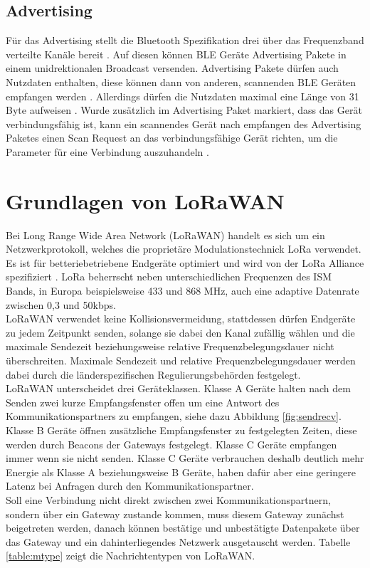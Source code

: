 \subsection{Advertising}
Für das Advertising stellt die Bluetooth Spezifikation drei über das Frequenzband verteilte Kanäle bereit \cite{blue2010channel}.
Auf diesen können BLE Geräte Advertising Pakete in einem unidrektionalen Broadcast versenden.
Advertising Pakete dürfen auch Nutzdaten enthalten, diese können dann von anderen, scannenden BLE Geräten empfangen werden \cite{blue2010advertising}.
Allerdings dürfen die Nutzdaten maximal eine Länge von 31 Byte aufweisen \cite{blue2010pdu}.
Wurde zusätzlich im Advertising Paket markiert, dass das Gerät verbindungsfähig ist, kann ein scannendes Gerät nach empfangen des Advertising Paketes einen Scan Request an das verbindungsfähige Gerät richten, um die Parameter für eine Verbindung auszuhandeln \cite{blue2010scanning}.

\section{Grundlagen von LoRaWAN}
Bei Long Range Wide Area Network (LoRaWAN) handelt es sich um ein Netzwerkprotokoll, welches die proprietäre Modulationstechnick LoRa verwendet.
Es ist für betteriebetriebene Endgeräte optimiert und wird von der LoRa Alliance spezifiziert \cite{lora2015spec}.
LoRa beherrscht neben unterschiedlichen Frequenzen des ISM Bands, in Europa beispielsweise 433 und 868 MHz, auch eine adaptive Datenrate zwischen 0,3 und 50kbps.\\
LoRaWAN verwendet keine Kollisionsvermeidung, stattdessen dürfen Endgeräte zu jedem Zeitpunkt senden, solange sie dabei den Kanal zufällig wählen und die maximale Sendezeit beziehungsweise relative Frequenzbelegungsdauer nicht überschreiten.
Maximale Sendezeit und relative Frequenzbelegungsdauer werden dabei durch die länderspezifischen Regulierungsbehörden festgelegt.\\
LoRaWAN unterscheidet drei Geräteklassen.
Klasse A Geräte halten nach dem Senden zwei kurze Empfangsfenster offen um eine Antwort des Kommunikationspartners zu empfangen, siehe dazu Abbildung \ref{fig:sendrecv}.
Klasse B Geräte öffnen zusätzliche Empfangsfenster zu festgelegten Zeiten, diese werden durch Beacons der Gateways festgelegt.
Klasse C Geräte empfangen immer wenn sie nicht senden. 
Klasse C Geräte verbrauchen deshalb deutlich mehr Energie als Klasse A beziehungsweise B Geräte, haben dafür aber eine geringere Latenz bei Anfragen durch den Kommunikationspartner.\\
Soll eine Verbindung nicht direkt zwischen zwei Kommunikationspartnern, sondern über ein Gateway zustande kommen, muss diesem Gateway zunächst beigetreten werden, danach können bestätige und unbestätigte Datenpakete über das Gateway und ein dahinterliegendes Netzwerk ausgetauscht werden.
Tabelle \ref{table:mtype} zeigt die Nachrichtentypen von LoRaWAN.

